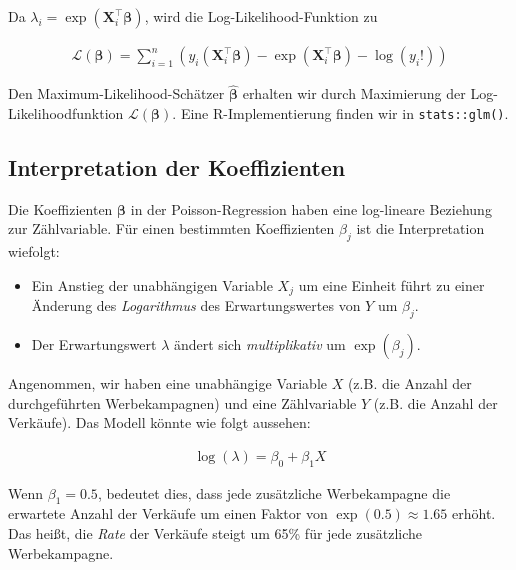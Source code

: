 \documentclass[
  a4paper,
  DIV=11,
  oneside]{scrreprt}
\begin{document}
Da \(\lambda_i = \exp(\mathbf{X}_i^\top \boldsymbol{\beta})\), wird die
Log-Likelihood-Funktion zu

\begin{align}
\mathcal{L}(\boldsymbol{\beta}) = \sum_{i=1}^n \left( y_i (\mathbf{X}_i^\top \boldsymbol{\beta}) - \exp(\mathbf{X}_i^\top \boldsymbol{\beta}) - \log(y_i!) \right)
\end{align}

Den Maximum-Likelihood-Schätzer \(\widehat{\boldsymbol{\beta}}\)
erhalten wir durch Maximierung der Log-Likelihoodfunktion
\(\mathcal{L}(\boldsymbol{\beta})\). Eine R-Implementierung finden wir
in \texttt{stats::glm()}.

\subsection{Interpretation der
Koeffizienten}\label{interpretation-der-koeffizienten}

Die Koeffizienten \(\boldsymbol{\beta}\) in der Poisson-Regression haben
eine log-lineare Beziehung zur Zählvariable. Für einen bestimmten
Koeffizienten \(\beta_j\) ist die Interpretation wiefolgt:

\begin{itemize}
\item
  Ein Anstieg der unabhängigen Variable \(X_j\) um eine Einheit führt zu
  einer Änderung des \emph{Logarithmus} des Erwartungswertes von \(Y\)
  um \(\beta_j\).
\item
  Der Erwartungswert \(\lambda\) ändert sich \emph{multiplikativ} um
  \(\exp(\beta_j)\).
\end{itemize}

Angenommen, wir haben eine unabhängige Variable \(X\) (z.B. die Anzahl
der durchgeführten Werbekampagnen) und eine Zählvariable \(Y\) (z.B. die
Anzahl der Verkäufe). Das Modell könnte wie folgt aussehen:

\begin{align}
\log(\lambda) = \beta_0 + \beta_1 X
\end{align}

Wenn \(\beta_1 = 0.5\), bedeutet dies, dass jede zusätzliche
Werbekampagne die erwartete Anzahl der Verkäufe um einen Faktor von
\(\exp(0.5) \approx 1.65\) erhöht. Das heißt, die \emph{Rate} der
Verkäufe steigt um 65\% für jede zusätzliche Werbekampagne.
\end{document}
